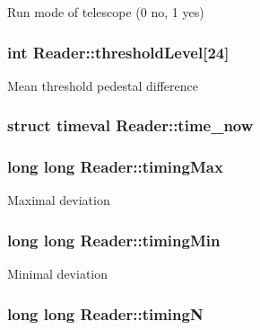 Run mode of telescope (0 no, 1 yes) \hypertarget{classReader_ae79b47c731fc265b3ca401cdbdccd726}{
\subsubsection[{threshold\-Level}]{\setlength{\rightskip}{0pt plus 5cm}int Reader\-::threshold\-Level\mbox{[}24\mbox{]}\hspace{0.3cm}{\ttfamily [private]}}}\label{classReader_ae79b47c731fc265b3ca401cdbdccd726}
Mean threshold pedestal difference \hypertarget{classReader_a4b26c73a9ce2d08fd78b11dca25c0ad6}{
\subsubsection[{time\-\_\-now}]{\setlength{\rightskip}{0pt plus 5cm}struct timeval Reader\-::time\-\_\-now\hspace{0.3cm}{\ttfamily [private]}}}\label{classReader_a4b26c73a9ce2d08fd78b11dca25c0ad6}
\hypertarget{classReader_a6cf0d42c4478dafaf61696bcc0c668f9}{
\subsubsection[{timing\-Max}]{\setlength{\rightskip}{0pt plus 5cm}long long Reader\-::timing\-Max\hspace{0.3cm}{\ttfamily [private]}}}\label{classReader_a6cf0d42c4478dafaf61696bcc0c668f9}
Maximal deviation \hypertarget{classReader_a6e85a422cbe42ab60c20b06e719bbdae}{
\subsubsection[{timing\-Min}]{\setlength{\rightskip}{0pt plus 5cm}long long Reader\-::timing\-Min\hspace{0.3cm}{\ttfamily [private]}}}\label{classReader_a6e85a422cbe42ab60c20b06e719bbdae}
Minimal deviation \hypertarget{classReader_a85c71a4d9f959cabea9cb7b168d966a0}{
\subsubsection[{timing\-N}]{\setlength{\rightskip}{0pt plus 5cm}long long Reader\-::timing\-N\hspace{0.3cm}{\ttfamily [private]}}}\label{classReader_a85c71a4d9f959cabea9cb7b168d966a0}

